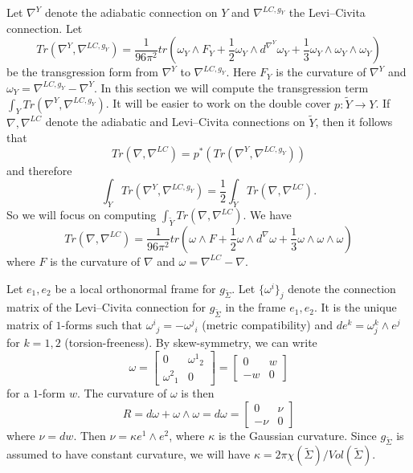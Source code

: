 \documentclass{amsart}
\theoremstyle{definition}
\theoremstyle{remark}
\numberwithin{equation}{section}
\begin{document}
Let $\nabla^Y$ denote the adiabatic connection on $Y$ and $\nabla^{LC,g_Y}$ the Levi--Civita connection. Let
\[
Tr(\nabla^Y , \nabla^{LC , g_Y}) = \frac{1}{96\pi^2} tr\left( \omega_Y \wedge F_Y + \frac{1}{2} \omega_Y \wedge d^{\nabla^Y} \omega_Y + \frac{1}{3} \omega_Y \wedge \omega_Y \wedge \omega_Y \right)
\]
be the transgression form from $\nabla^Y$ to $\nabla^{LC, g_Y}$. Here $F_Y$ is the curvature of $\nabla^Y$ and $\omega_Y = \nabla^{LC , g_Y} - \nabla^Y$. In this section we will compute the transgression term $\int_Y Tr(\nabla^Y , \nabla^{LC , g_Y})$. It will be easier to work on the double cover $p \colon \widetilde{Y} \to Y$. If $\nabla, \nabla^{LC}$ denote the adiabatic and Levi--Civita connections on $\widetilde{Y}$, then it follows that
\[
Tr(\nabla , \nabla^{LC}) = p^*( Tr(\nabla^Y , \nabla^{LC,g_Y}))
\]
and therefore
\[
\int_Y Tr(\nabla^Y , \nabla^{LC , g_Y}) = \frac{1}{2}\int_{\widetilde{Y}} Tr(\nabla , \nabla^{LC}).
\]
So we will focus on computing $\int_{\widetilde{Y}} Tr(\nabla , \nabla^{LC})$. We have
\[
Tr(\nabla , \nabla^{LC}) = \frac{1}{96\pi^2} tr\left( \omega \wedge F + \frac{1}{2} \omega \wedge d^{\nabla} \omega + \frac{1}{3} \omega \wedge \omega \wedge \omega \right)
\]
where $F$ is the curvature of $\nabla$ and $\omega = \nabla^{LC} - \nabla$.

Let $e_1,e_2$ be a local orthonormal frame for $g_{\widetilde{\Sigma}}$. Let $\{ \omega^i \}_j$ denote the connection matrix of the Levi--Civita connection for $g_{\widetilde{\Sigma}}$ in the frame $e_1,e_2$. It is the unique matrix of $1$-forms such that ${\omega^i}_j = -{\omega^j}_i$ (metric compatibility) and $de^k = {\omega^k_j} \wedge e^j$ for $k=1,2$ (torsion-freeness). By skew-symmetry, we can write
\[
\omega = \left[ \begin{matrix} 0 & {\omega^1}_2 \\ {\omega^2}_1 & 0 \end{matrix} \right] = \left[ \begin{matrix} 0 & w \\ -w & 0 \end{matrix} \right]
\]
for a $1$-form $w$. The curvature of $\omega$ is then
\[
R = d\omega + \omega \wedge \omega = d\omega = \left[ \begin{matrix} 0 & \nu \\ -\nu & 0 \end{matrix} \right]
\]
where $\nu = dw$. Then $\nu = \kappa e^1 \wedge e^2$, where $\kappa$ is the Gaussian curvature. Since $g_{\widetilde{\Sigma}}$ is assumed to have constant curvature, we will have $\kappa = 2 \pi \chi(\widetilde{\Sigma})/Vol(\widetilde{\Sigma})$.
\end{document}
